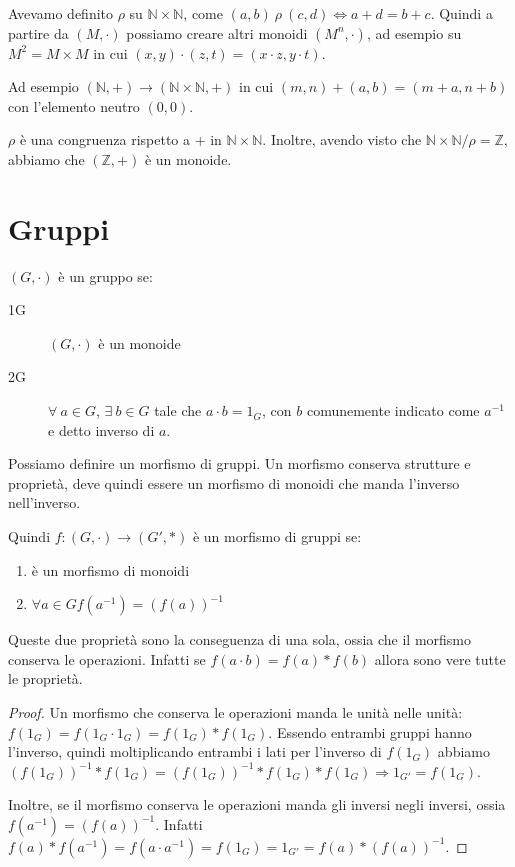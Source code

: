 Avevamo definito $\rho$ su $\mathbb{N} \times \mathbb{N}$, come $(a, b) \ \rho \ (c, d) \Leftrightarrow a+d = b+c$. Quindi a partire da $(M, \cdot) $ possiamo creare altri monoidi $(M^n, \cdot)$, ad esempio su $M^2 = M \times M$ in cui $(x, y) \cdot (z, t) = (x \cdot z, y \cdot t)$.

Ad esempio $(\mathbb{N}, +) \to (\mathbb{N} \times \mathbb{N}, +)$ in cui $(m, n) + (a, b) = (m+a, n+b)$ con l'elemento neutro $(0,0)$.

$\rho$ \`e una congruenza rispetto a + in $\mathbb{N} \times \mathbb{N}$. Inoltre, avendo visto che $\mathbb{N} \times \mathbb{N} / \rho = \mathbb{Z}$, abbiamo che $(\mathbb{Z}, +)$ \`e un monoide.


\section{Gruppi}

\begin{defn}
$(G, \cdot)$ \`e un gruppo se:
\begin{description}
    \item[1G] $(G, \cdot)$ \`e un monoide
    \item[2G] $\forall \ a \in G $, $ \exists \ b \in G $ tale che $a \cdot b = 1_G$, con $b$ comunemente indicato come $a^{-1}$ e detto inverso di $a$.
\end{description}
\end{defn}

Possiamo definire un morfismo di gruppi. Un morfismo conserva strutture e propriet\`a, deve quindi essere un morfismo di monoidi che manda l'inverso nell'inverso.
\begin{defn}
Quindi $f : (G, \cdot) \to (G', \ast)$ \`e un morfismo di gruppi se:
\begin{enumerate}
    \item \`e un morfismo di monoidi
    \item $\forall a \in G f(a^{-1}) = (f(a))^{-1}$
\end{enumerate}
\end{defn}
\begin{prop}
Queste due propriet\`a sono la conseguenza di una sola, ossia che il morfismo conserva le operazioni. Infatti se $f(a \cdot b) = f(a) \ast f(b)$ allora sono vere tutte le propriet\`a.
\end{prop}
\begin{proof}
Un morfismo che conserva le operazioni manda le unit\`a nelle unit\`a: $f(1_G) = f(1_G \cdot 1_G) = f(1_G) \ast f(1_G)$. Essendo entrambi gruppi hanno l'inverso, quindi moltiplicando entrambi i lati per l'inverso di $f(1_G)$ abbiamo $(f(1_G))^{-1} \ast f(1_G) = (f(1_G))^{-1} \ast f(1_G) \ast f(1_G) \Rightarrow 1_{G'} = f(1_G)$.

Inoltre, se il morfismo conserva le operazioni manda gli inversi negli inversi, ossia $f(a^{-1}) = (f(a))^{-1}$. Infatti $f(a) \ast f(a^{-1}) = f(a \cdot a^{-1}) = f(1_G) = 1_{G'} = f(a) \ast (f(a))^{-1}$.
\end{proof}


